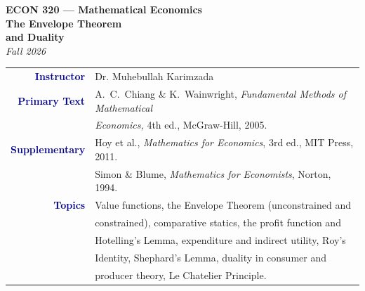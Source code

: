 \documentclass[12pt, a4paper]{article}
\theoremstyle{definition}
\begin{document}

\thispagestyle{empty}

\vspace*{-1.7cm}
\begin{center}
  {\color{white}\large\bfseries\sffamily ECON 320 --- Mathematical Economics}\\[10pt]
  {\color{white}\Huge\bfseries The Envelope Theorem}\\[6pt]
  {\color{white}\Huge\bfseries and Duality}\\[10pt]
  {\color{gold}\Large\itshape
 Fall 2026}
\end{center}

\vspace{3.8cm}
\begin{center}
\begin{tabular}{r l}
  \textbf{\textcolor{darkblue}{Instructor}}
    & Dr. Muhebullah Karimzada \\[3pt]
  \textbf{\textcolor{darkblue}{Primary Text}}
    & A.\ C.\ Chiang \& K.\ Wainwright,
      \textit{Fundamental Methods of Mathematical }\\
    & \textit{Economics,} 4th ed., McGraw-Hill, 2005. \\[3pt]
  \textbf{\textcolor{darkblue}{Supplementary}}
    & Hoy et al., \textit{Mathematics for Economics}, 3rd ed., MIT Press, 2011. \\[2pt]
    & Simon \& Blume, \textit{Mathematics for Economists}, Norton, 1994. \\[3pt]
  \textbf{\textcolor{darkblue}{Topics}}
    & Value functions, the Envelope Theorem (unconstrained and \\
    & constrained), comparative statics, the profit function and \\
    & Hotelling's Lemma, expenditure and indirect utility, Roy's \\
    & Identity, Shephard's Lemma, duality in consumer and \\
    & producer theory, Le Chatelier Principle. \\
\end{tabular}
\end{center}
\end{document}

